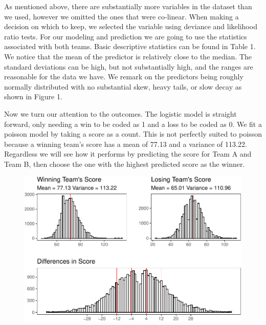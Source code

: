 \documentclass[
  man,floatsintext]{apa6}
\begin{document}
As mentioned above, there are substantially more variables in the dataset than we used, however we omitted the ones that were co-linear. When making a decision on which to keep, we selected the variable using deviance and likelihood ratio tests. For our modeling and prediction we are going to use the statistics associated with both teams. Basic descriptive statistics can be found in Table 1. We notice that the mean of the predictor is relatively close to the median. The standard deviations can be high, but not substantially high, and the ranges are reasonable for the data we have. We remark on the predictors being roughly normally distributed with no substantial skew, heavy tails, or slow decay as shown in Figure 1.

Now we turn our attention to the outcomes. The logistic model is straight forward, only needing a win to be coded as 1 and a loss to be coded as 0. We fit a poisson model by taking a score as a count. This is not perfectly suited to poisson because a winning team's score has a mean of 77.13 and a variance of 113.22. Regardless we will see how it performs by predicting the score for Team A and Team B, then choose the one with the highest predicted score as the winner.

\begin{figure}

{\centering \includegraphics{paper_files/figure-latex/unnamed-chunk-3-1} 

}

\caption{ }\label{fig:unnamed-chunk-3}
\end{figure}
\end{document}
